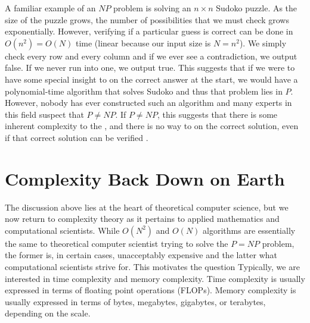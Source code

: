 A familiar example of an $NP$ problem is solving an $n \times n$ Sudoko puzzle. As the size of the puzzle grows, the number of possibilities that we must check grows exponentially. However, verifying if a particular guess is correct can be done in $O(n^2) = O(N)$ time (linear because our input size is $N=n^2$). We simply check every row and every column and if we ever see a contradiction, we output false. If we never run into one, we output true. This suggests that if we were to have some special insight to  on the correct answer at the start, we would have a polynomial-time algorithm that solves Sudoko and thus that problem lies in $P$. However, nobody has ever constructed such an algorithm and many experts in this field suspect that $P \neq NP$. If $P \neq NP$, this suggests that there is some inherent complexity to the , and there is no  way to  on the correct solution, even if that correct solution can be verified .

\section{Complexity Back Down on Earth}
The discussion above lies at the heart of theoretical computer science, but we now return to complexity theory as it pertains to applied mathematics and computational scientists. 
While $O(N^{2})$ and $O(N)$ algorithms are essentially the same to theoretical computer scientist trying to solve the $P=NP$ problem, the former is, in certain cases, unacceptably expensive and the latter what computational scientists strive for. 
This motivates the question  Typically, we are interested in time complexity and memory complexity. Time complexity is usually expressed in terms of floating point operations (FLOPs). Memory complexity is usually expressed in terms of bytes, megabytes, gigabytes, or terabytes, depending on the scale.

